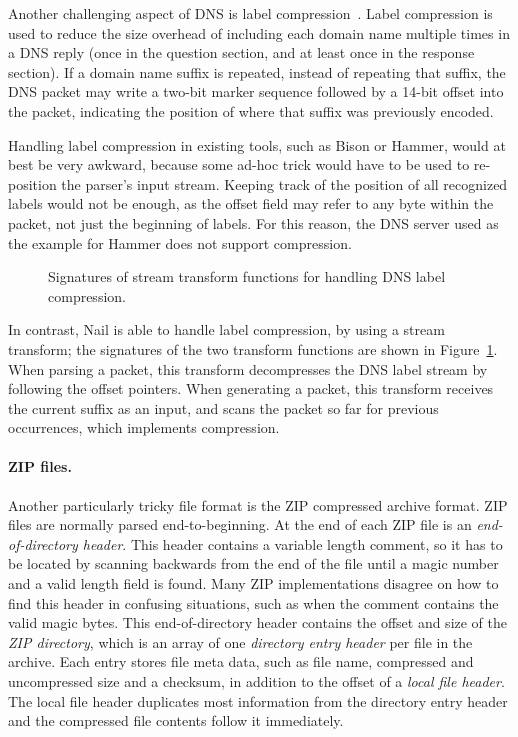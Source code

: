 Another challenging aspect of DNS is label
compression~\cite[\S4.1.4]{RFC:1035}.  Label compression is used to reduce
the size overhead of including each domain name multiple times in a DNS
reply (once in the question section, and at least once in the response
section).  If a domain name suffix is repeated, instead of repeating that
suffix, the DNS packet may write a two-bit marker sequence followed by
a 14-bit offset into the packet, indicating the position of where that
suffix was previously encoded.



Handling label compression in existing tools, such as Bison or Hammer,
would at best be very awkward, because some ad-hoc trick would have to
be used to re-position the parser's input stream.  Keeping track of the
position of all recognized labels would not be enough, as the offset field
may refer to any byte within the packet, not just the beginning of labels.
For this reason, the DNS server used as the example for Hammer does not
support compression.

\begin{figure}
\smaller[0.5]

\caption{Signatures of stream transform functions for handling DNS label compression.}
\label{fig:dns-xform}
\end{figure}

In contrast, Nail is able to handle label compression, by using a stream
transform; the signatures of the two transform functions are shown
in Figure~\ref{fig:dns-xform}.  When parsing a packet, this transform
decompresses the DNS label stream by following the offset pointers.
When generating a packet, this transform receives the current suffix as
an input, and scans the packet so far for previous occurrences, which
implements compression.


\paragraph{ZIP files.}


\label{s:eval-format-zip}
Another particularly tricky file format is the ZIP compressed archive format\cite{pkzip}.
ZIP files are normally parsed end-to-beginning. At the end of each ZIP file is an \emph{end-of-directory
header}. This header contains a variable length comment, so it has to be located by scanning
backwards from the end of the file until a magic number and a valid length field is found. Many ZIP
implementations disagree on how to find this header in confusing situations, such as when the
comment contains the valid magic bytes\cite{wolf:berlinsides-zip}.
This end-of-directory header contains the offset and size of the \emph{ZIP directory}, which is an
array of one \emph{directory entry header} per file in the archive.
Each entry stores file meta data, such as file name, compressed and uncompressed size and a checksum,
in addition to the offset of a \emph{local file header}. The local file header duplicates most
information from the directory entry header and the compressed file contents follow it immediately.

